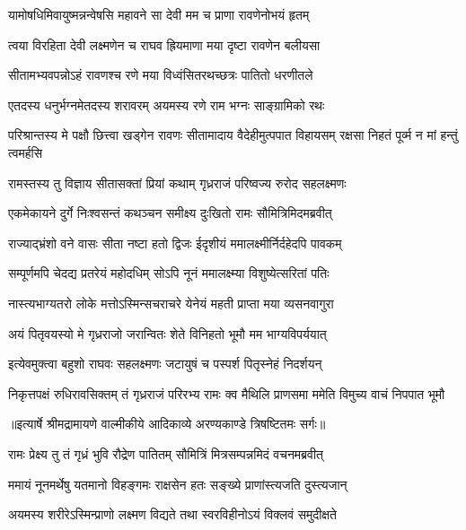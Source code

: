 \twolineshloka
{यामोषधिमिवायुष्मन्नन्वेषसि महावने}
{सा देवी मम च प्राणा रावणेनोभयं हृतम्} %

\twolineshloka
{त्वया विरहिता देवी लक्ष्मणेन च राघव}
{ह्रियमाणा मया दृष्टा रावणेन बलीयसा} %

\twolineshloka
{सीतामभ्यवपन्नोऽहं रावणश्च रणे मया}
{विध्वंसितरथच्छत्रः पातितो धरणीतले} %

\twolineshloka
{एतदस्य धनुर्भग्नमेतदस्य शरावरम्}
{अयमस्य रणे राम भग्नः साङ्ग्रामिको रथः} %

\threelineshloka
{परिश्रान्तस्य मे पक्षौ छित्त्वा खड्गेन रावणः}
{सीतामादाय वैदेहीमुत्पपात विहायसम्}
{रक्षसा निहतं पूर्व्म न मां हन्तुं त्वमर्हसि} %

\twolineshloka
{रामस्तस्य तु विज्ञाय सीतासक्तां प्रियां कथाम्}
{गृध्रराजं परिष्वज्य रुरोद सहलक्ष्मणः} %

\twolineshloka
{एकमेकायने दुर्गे निःश्वसन्तं कथञ्चन}
{समीक्ष्य दुःखितो रामः सौमित्रिमिदमब्रवीत्} %

\twolineshloka
{राज्याद्भ्रंशो वने वासः सीता नष्टा हतो द्विजः}
{ईदृशीयं ममालक्ष्मीर्निर्दहेदपि पावकम्} %

\twolineshloka
{सम्पूर्णमपि चेदद्य प्रतरेयं महोदधिम्}
{सोऽपि नूनं ममालक्ष्म्या विशुष्येत्सरितां पतिः} %

\twolineshloka
{नास्त्यभाग्यतरो लोके मत्तोऽस्मिन्सचराचरे}
{येनेयं महती प्राप्ता मया व्यसनवागुरा} %

\twolineshloka
{अयं पितृवयस्यो मे गृध्रराजो जरान्वितः}
{शेते विनिहतो भूमौ मम भाग्यविपर्ययात्} %

\twolineshloka
{इत्येवमुक्त्वा बहुशो राघवः सहलक्ष्मणः}
{जटायुषं च पस्पर्श पितृस्नेहं निदर्शयन्} %

\fourlineindentedshloka
{निकृत्तपक्षं रुधिरावसिक्तम्}
{तं गृध्रराजं परिरभ्य रामः}
{क्व मैथिलि प्राणसमा ममेति}
{विमुच्य वाचं निपपात भूमौ} %


{॥इत्यार्षे श्रीमद्रामायणे वाल्मीकीये आदिकाव्ये अरण्यकाण्डे त्रिषष्टितमः सर्गः॥}


\twolineshloka
{रामः प्रेक्ष्य तु तं गृध्रं भुवि रौद्रेण पातितम्}
{सौमित्रिं मित्रसम्पन्नमिदं वचनमब्रवीत्} %

\twolineshloka
{ममायं नूनमर्थेषु यतमानो विहङ्गमः}
{राक्षसेन हतः सङ्ख्ये प्राणांस्त्यजति दुस्त्यजान्} %

\twolineshloka
{अयमस्य शरीरेऽस्मिन्प्राणो लक्ष्मण विद्यते}
{तथा स्वरविहीनोऽयं विक्लवं समुदीक्षते} %

